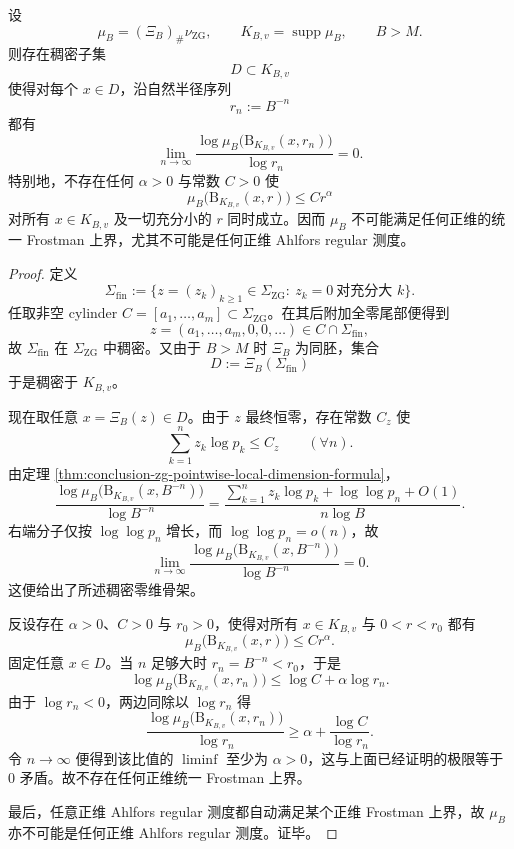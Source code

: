 \begin{theorem}\label{thm:conclusion-zg-dense-zero-skeleton-no-positive-frostman-law}
设
\[
\mu_B=(\Xi_B)_\#\nu_{\mathrm{ZG}},
\qquad
K_{B,v}=\operatorname{supp}\mu_B,
\qquad
B>M.
\]
则存在稠密子集
\[
D\subset K_{B,v}
\]
使得对每个 \(x\in D\)，沿自然半径序列
\[
r_n:=B^{-n}
\]
都有
\[
\lim_{n\to\infty}
\frac{\log \mu_B\!\bigl(\mathrm B_{K_{B,v}}(x,r_n)\bigr)}
{\log r_n}
=0.
\]
特别地，不存在任何 \(\alpha>0\) 与常数 \(C>0\) 使
\[
\mu_B\!\bigl(\mathrm B_{K_{B,v}}(x,r)\bigr)\le C r^\alpha
\]
对所有 \(x\in K_{B,v}\) 及一切充分小的 \(r\) 同时成立。因而 \(\mu_B\) 不可能满足任何正维的统一 Frostman 上界，尤其不可能是任何正维 Ahlfors regular 测度。
\end{theorem}
\begin{proof}
定义
\[
\Sigma_{\mathrm{fin}}
:=
\{z=(z_k)_{k\ge 1}\in\Sigma_{\mathrm{ZG}}:\ z_k=0\ \text{对充分大 }k\}.
\]
任取非空 cylinder \(C=[a_1,\dots,a_m]\subset \Sigma_{\mathrm{ZG}}\)。在其后附加全零尾部便得到
\[
z=(a_1,\dots,a_m,0,0,\dots)\in C\cap \Sigma_{\mathrm{fin}},
\]
故 \(\Sigma_{\mathrm{fin}}\) 在 \(\Sigma_{\mathrm{ZG}}\) 中稠密。又由于 \(B>M\) 时 \(\Xi_B\) 为同胚，集合
\[
D:=\Xi_B(\Sigma_{\mathrm{fin}})
\]
于是稠密于 \(K_{B,v}\)。

现在取任意 \(x=\Xi_B(z)\in D\)。由于 \(z\) 最终恒零，存在常数 \(C_z\) 使
\[
\sum_{k=1}^{n}z_k\log p_k\le C_z
\qquad(\forall n).
\]
由定理 \ref{thm:conclusion-zg-pointwise-local-dimension-formula}，
\[
\frac{\log \mu_B\!\bigl(\mathrm B_{K_{B,v}}(x,B^{-n})\bigr)}{\log B^{-n}}
=
\frac{\sum_{k=1}^{n}z_k\log p_k+\log\log p_n+O(1)}{n\log B}.
\]
右端分子仅按 \(\log\log p_n\) 增长，而 \(\log\log p_n=o(n)\)，故
\[
\lim_{n\to\infty}
\frac{\log \mu_B\!\bigl(\mathrm B_{K_{B,v}}(x,B^{-n})\bigr)}{\log B^{-n}}
=0.
\]
这便给出了所述稠密零维骨架。

反设存在 \(\alpha>0\)、\(C>0\) 与 \(r_0>0\)，使得对所有 \(x\in K_{B,v}\) 与 \(0<r<r_0\) 都有
\[
\mu_B\!\bigl(\mathrm B_{K_{B,v}}(x,r)\bigr)\le C r^\alpha.
\]
固定任意 \(x\in D\)。当 \(n\) 足够大时 \(r_n=B^{-n}<r_0\)，于是
\[
\log \mu_B\!\bigl(\mathrm B_{K_{B,v}}(x,r_n)\bigr)
\le
\log C+\alpha\log r_n.
\]
由于 \(\log r_n<0\)，两边同除以 \(\log r_n\) 得
\[
\frac{\log \mu_B\!\bigl(\mathrm B_{K_{B,v}}(x,r_n)\bigr)}{\log r_n}
\ge
\alpha+\frac{\log C}{\log r_n}.
\]
令 \(n\to\infty\) 便得到该比值的 \(\liminf\) 至少为 \(\alpha>0\)，这与上面已经证明的极限等于 \(0\) 矛盾。故不存在任何正维统一 Frostman 上界。

最后，任意正维 Ahlfors regular 测度都自动满足某个正维 Frostman 上界，故 \(\mu_B\) 亦不可能是任何正维 Ahlfors regular 测度。证毕。
\end{proof}
